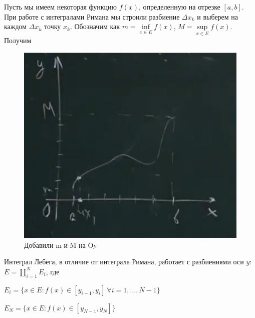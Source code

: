 Пусть мы имеем некоторая функцию $f(x)$, определенную на отрезке $[a, b]$.
При работе с интегралами Римана мы строили разбиение $\Delta x_k$ и выберем на каждом $\Delta x_k$
точку $x_k$.
Обозначим как 
$m = \inf\limits_{x \in E} f(x)$, $M = \sup\limits_{x \in E} f(x)$.
Получим
\begin{figure}[H]
    \centering
    \includegraphics[scale=0.5]{images/lebeg.png}
    \caption{Добавили m и M на Oy}
\end{figure}

Интеграл Лебега, в отличие от интеграла Римана, работает
с разбиениями оси $y$: $E = \coprod\limits_{i = 1}^N E_i$, где

$E_i = \{ x \in E: f(x) \in [y_{i - 1}, y_i]~ \forall i = 1, \dots, N - 1\}$

$E_N = \{x \in E: f(x) \in [y_{N - 1}, y_N]\}$

